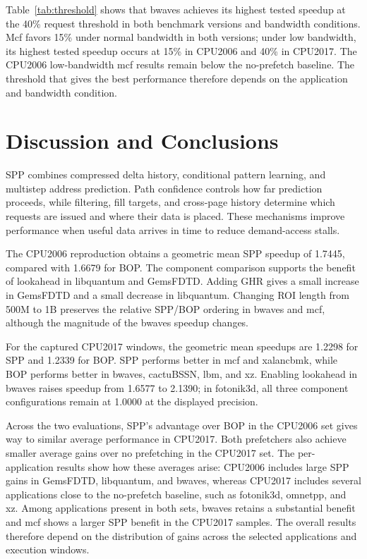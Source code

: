 \documentclass[a4paper,11pt]{article}
\begin{document}
Table~\ref{tab:threshold} shows that bwaves achieves its highest tested speedup at the 40\% request threshold in both benchmark versions and bandwidth conditions. Mcf favors 15\% under normal bandwidth in both versions; under low bandwidth, its highest tested speedup occurs at 15\% in CPU2006 and 40\% in CPU2017. The CPU2006 low-bandwidth mcf results remain below the no-prefetch baseline. The threshold that gives the best performance therefore depends on the application and bandwidth condition.

\section{Discussion and Conclusions}
SPP combines compressed delta history, conditional pattern learning, and multistep address prediction. Path confidence controls how far prediction proceeds, while filtering, fill targets, and cross-page history determine which requests are issued and where their data is placed. These mechanisms improve performance when useful data arrives in time to reduce demand-access stalls.

The CPU2006 reproduction obtains a geometric mean SPP speedup of 1.7445, compared with 1.6679 for BOP. The component comparison supports the benefit of lookahead in libquantum and GemsFDTD. Adding GHR gives a small increase in GemsFDTD and a small decrease in libquantum. Changing ROI length from 500M to 1B preserves the relative SPP/BOP ordering in bwaves and mcf, although the magnitude of the bwaves speedup changes.

For the captured CPU2017 windows, the geometric mean speedups are 1.2298 for SPP and 1.2339 for BOP. SPP performs better in mcf and xalancbmk, while BOP performs better in bwaves, cactuBSSN, lbm, and xz. Enabling lookahead in bwaves raises speedup from 1.6577 to 2.1390; in fotonik3d, all three component configurations remain at 1.0000 at the displayed precision.

Across the two evaluations, SPP's advantage over BOP in the CPU2006 set gives way to similar average performance in CPU2017. Both prefetchers also achieve smaller average gains over no prefetching in the CPU2017 set. The per-application results show how these averages arise: CPU2006 includes large SPP gains in GemsFDTD, libquantum, and bwaves, whereas CPU2017 includes several applications close to the no-prefetch baseline, such as fotonik3d, omnetpp, and xz. Among applications present in both sets, bwaves retains a substantial benefit and mcf shows a larger SPP benefit in the CPU2017 samples. The overall results therefore depend on the distribution of gains across the selected applications and execution windows.
\end{document}
